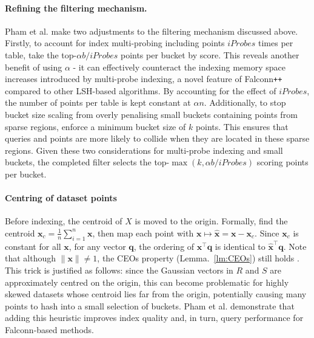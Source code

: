 \documentclass{article}
\newcommand{\bx}{\mathbf{x}}
\newcommand{\bq}{\mathbf{q}}
\newcommand{\ip}{iProbes\xspace}
\newcommand{\fpp}{Falconn\texttt{++}\xspace}
\begin{document}
\paragraph{Refining the filtering mechanism.} 

Pham et al. make two adjustments to the filtering mechanism discussed above. Firstly, to account for index multi-probing including points $iProbes$ times per table, take the top-$\alpha b / \ip$ points per bucket by score. This reveals another benefit of using $\alpha$ - it can effectively counteract the indexing memory space increases introduced by multi-probe indexing, a novel feature of \fpp compared to other LSH-based algorithms. By accounting for the effect of $iProbes$, the number of points per table is kept constant at $\alpha n$.
Additionally, to stop bucket size scaling from overly penalising small buckets containing points from sparse regions, enforce a minimum bucket size of $k$ points. This ensures that queries and points are more likely to collide when they are located in these sparse regions. Given these two considerations for multi-probe indexing and small buckets, the completed filter selects the top-$\max(k, \alpha b / iProbes)$ scoring points per bucket. 

\paragraph{Centring of dataset points} 

Before indexing, the centroid of $X$ is moved to the origin. Formally, find the centroid $\bx_c = \frac{1}{n}\sum_{i=1}^n\bx$, then map each point with $\bx \mapsto \hat{\bx} = \bx - \bx_c$. Since $\bx_c$ is constant for all $\bx$, for any vector $\bq$, the ordering of $\bx^\top \bq$ is identical to $\hat{\bx}^\top \bq$. Note that although $\|\bx\| \ne 1$, the CEOs property (Lemma.~\ref{lm:CEOs}) still holds \cite{pham2021simple}. This trick is justified as follows: since the Gaussian vectors in $R$ and $S$ are approximately centred on the origin, this can become problematic for highly skewed datasets whose centroid lies far from the origin, potentially causing many points to hash into a small selection of buckets. Pham et al. demonstrate that adding this heuristic improves index quality and, in turn, query performance for Falconn-based methods.
\end{document}
